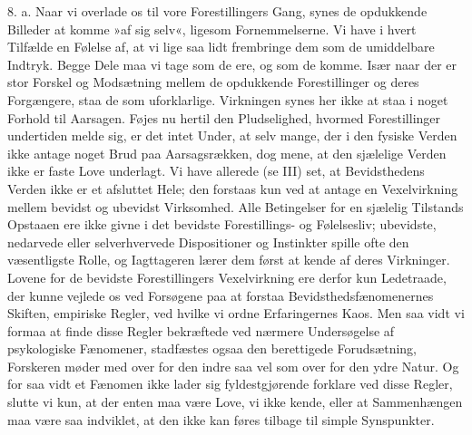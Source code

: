 \documentclass[12pt,a4paper,openany]{book}
\begin{document}
8. a. Naar vi overlade os til vore Forestillingers Gang, synes de
opdukkende Billeder at komme »af sig selv«, ligesom Fornemmelserne. Vi
have i hvert Tilfælde en Følelse af, at vi lige saa lidt frembringe dem
som de umiddelbare Indtryk. Begge Dele maa vi tage som de ere, og som de
komme. Især naar der er stor Forskel og Modsætning mellem de opdukkende
Forestillinger og deres Forgængere, staa de som uforklarlige. Virkningen
synes her ikke at staa i noget Forhold til Aarsagen. Føjes nu hertil den
Pludselighed, hvormed Forestillinger undertiden melde sig, er det intet
Under, at selv mange, der i den fysiske Verden ikke antage noget Brud
paa Aarsagsrækken, dog mene, at den sjælelige Verden ikke er faste Love
underlagt. Vi have allerede (se III) set, at Bevidsthedens Verden ikke
er et afsluttet Hele; den forstaas kun ved at antage en Vexelvirkning
mellem bevidst og ubevidst Virksomhed. Alle Betingelser for en sjælelig
Tilstands Opstaaen ere ikke givne i det bevidste Forestillings- og
Følelsesliv; ubevidste, nedarvede eller selverhvervede Dispositioner og
Instinkter spille ofte den væsentligste Rolle, og Iagttageren lærer dem
først at kende af deres Virkninger. Lovene for de bevidste
Forestillingers Vexelvirkning ere derfor kun Ledetraade, der kunne
vejlede os ved Forsøgene paa at forstaa Bevidsthedsfænomenernes Skiften,
empiriske Regler, ved hvilke vi ordne Erfaringernes Kaos. Men saa vidt
vi formaa at finde disse Regler bekræftede ved nærmere Undersøgelse af
psykologiske Fænomener, stadfæstes ogsaa den berettigede Forudsætning,
Forskeren møder med over for den indre saa vel som over for den ydre
Natur. Og for saa vidt et Fænomen ikke lader sig fyldestgjørende
forklare ved disse Regler, slutte vi kun, at der enten maa være Love, vi
ikke kende, eller at Sammenhængen maa være saa indviklet, at den ikke
kan føres tilbage til simple Synspunkter.
\end{document}
